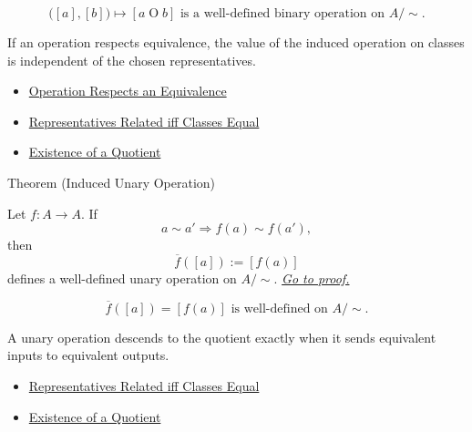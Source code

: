 \begin{remark*}
\[
\bigl([a],[b]\bigr)\longmapsto [a\mathbin{O}b]
\text{ is a well-defined binary operation on } A/{\sim}.
\]
\end{remark*}

\begin{remark*}[Interpretation]
If an operation respects equivalence, the value of the induced operation on
classes is independent of the chosen representatives.
\end{remark*}

\begin{dependencies}
\begin{itemize}
  \item \hyperref[def:operation-respects-equivalence]{Operation Respects an Equivalence}
  \item \hyperref[prop:representatives-related-iff-classes-equal]{Representatives Related iff Classes Equal}
  \item \hyperref[thm:existence-of-a-quotient]{Existence of a Quotient}
\end{itemize}
\end{dependencies}

\begin{theorembox}{Theorem (Induced Unary Operation)}
\begin{theorem}
\label{thm:induced-unary-operation-on-quotient}
Let $f:A\to A$. If
\[
a\sim a'\Longrightarrow f(a)\sim f(a'),
\]
then
\[
\overline{f}([a]):=[f(a)]
\]
defines a well-defined unary operation on $A/{\sim}$.
\hyperref[prf:induced-unary-operation-on-quotient]{\textit{Go to proof.}}
\end{theorem}
\end{theorembox}

\begin{remark*}
\[
\overline{f}([a])=[f(a)]
\text{ is well-defined on } A/{\sim}.
\]
\end{remark*}

\begin{remark*}[Interpretation]
A unary operation descends to the quotient exactly when it sends equivalent
inputs to equivalent outputs.
\end{remark*}

\begin{dependencies}
\begin{itemize}
  \item \hyperref[prop:representatives-related-iff-classes-equal]{Representatives Related iff Classes Equal}
  \item \hyperref[thm:existence-of-a-quotient]{Existence of a Quotient}
\end{itemize}
\end{dependencies}

